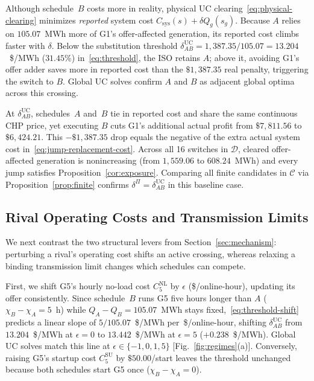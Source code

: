 \documentclass[journal]{IEEEtran}
\newcommand{\UC}{\mathrm{UC}}
\begin{document}
Although schedule~$B$ costs more in reality, physical UC clearing~\eqref{eq:physical-clearing} minimizes \emph{reported} system cost $C_{\mathrm{sys}}(s)\!\!+\!\!\delta Q_g(s_g)$. Because $A$ relies on $105.07$~MWh more of G1's offer-affected generation, its reported cost climbs faster with $\delta$. Below the substitution threshold $\delta_{AB}^{\UC}\!\!=\!\!1{,}387.35/105.07\!\!=\!\!13.204$~\$/MWh ($31.45\%$) in~\eqref{eq:threshold}, the ISO retains $A$; above it, avoiding G1's offer adder saves more in reported cost than the $\$1{,}387.35$ real penalty, triggering the switch to $B$. Global UC solves confirm $A$ and $B$ as adjacent global optima across this crossing.

At $\delta_{AB}^{\UC}$, schedules~$A$ and~$B$ tie in reported cost and share the same continuous CHP price, yet executing $B$ cuts G1's additional actual profit from $\$7{,}811.56$ to $\$6{,}424.21$. This $-\$1{,}387.35$ drop equals the negative of the extra actual system cost in~\eqref{eq:jump-replacement-cost}. Across all 16 switches in $\mathcal{D}$, cleared offer-affected generation is nonincreasing (from $1{,}559.06$ to $608.24$~MWh) and every jump satisfies Proposition~\ref{cor:exposure}. Comparing all finite candidates in $\mathcal{C}$ via Proposition~\ref{prop:finite} confirms $\delta^{\Pi}=\delta_{AB}^{\UC}$ in this baseline case.

\subsection{Rival Operating Costs and Transmission Limits}\label{sec:results-conditions}
We next contrast the two structural levers from Section~\ref{sec:mechanism}: perturbing a rival's operating cost shifts an active crossing, whereas relaxing a binding transmission limit changes which schedules can compete.

First, we shift G5's hourly no-load cost $C_5^{\mathrm{NL}}$ by $\epsilon$ (\$/online-hour), updating its offer consistently. Since schedule~$B$ runs G5 five hours longer than $A$ ($\chi_B-\chi_A=5$~h) while $Q_A-Q_B=105.07$~MWh stays fixed,~\eqref{eq:threshold-shift} predicts a linear slope of $5/105.07$~\$/MWh per~\$/online-hour, shifting $\delta_{AB}^{\UC}$ from $13.204$~\$/MWh at $\epsilon=0$ to $13.442$~\$/MWh at $\epsilon=5$ ($+0.238$~\$/MWh). Global UC solves match this line at $\epsilon\in\{-1,0,1,5\}$ [Fig.~\ref{fig:regimes}(a)]. Conversely, raising G5's startup cost $C_5^{\mathrm{SU}}$ by $\$50.00$/start leaves the threshold unchanged because both schedules start G5 once ($\chi_B-\chi_A=0$).
\end{document}
